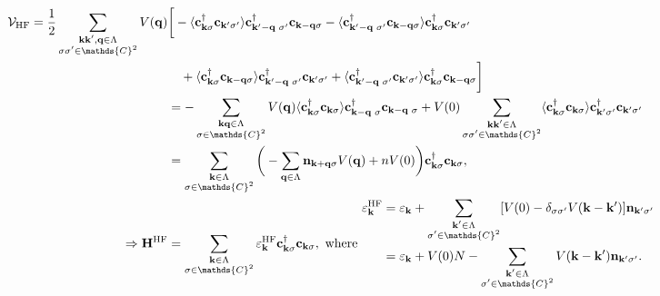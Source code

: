 \documentclass{homework}
\begin{document}
\begin{equation}
\begin{split}
    \mathcal{V}_{\textnormal{HF}} = \frac{1}{2} \sum_{\substack{{\bf k}{\bf k}',{\bf q} \in \Lambda\\
    \sigma \sigma' \in \mathds{C}^2}} V({\bf q}) &\bigg[-\langle 
    {\bf c}_{{\bf k}\sigma}^\dagger {\bf c}_{{\bf k}'\sigma'}
    \rangle {\bf c}_{{\bf k}'-{\bf q} \blanky \sigma'}^\dagger {\bf c}_{{\bf k}-{\bf q} \sigma} 
    -  \langle {\bf c}_{{\bf k}'-{\bf q} \blanky \sigma'}^\dagger {\bf c}_{{\bf k}-{\bf q} \sigma}  \rangle {\bf c}_{{\bf k}\sigma}^\dagger {\bf c}_{{\bf k}'\sigma'} \\
    & \blanky \blanky \blanky + \langle {\bf c}_{{\bf k}\sigma}^\dagger {\bf c}_{{\bf k}-{\bf q} \sigma} \rangle {\bf c}_{{\bf k}'-{\bf q} \blanky \sigma'}^\dagger {\bf c}_{{\bf k}'\sigma'}
    +  \langle {\bf c}_{{\bf k}'-{\bf q} \blanky \sigma'}^\dagger {\bf c}_{{\bf k}'\sigma'} \rangle {\bf c}_{{\bf k}\sigma}^\dagger {\bf c}_{{\bf k}-{\bf q} \sigma} 
    \bigg] \\
    &= - \sum_{\substack{{\bf k}{\bf q} \in \Lambda\\
    \sigma \in \mathds{C}^2}} V({\bf q})  \langle {\bf c}_{{\bf k} \sigma}^\dagger {\bf c}_{{\bf k} \sigma} \rangle {\bf c}_{{\bf k}-{\bf q} \blanky \sigma}^\dagger {\bf c}_{{\bf k}-{\bf q} \blanky \sigma} + V(0) \sum_{\substack{{\bf k}{\bf k}' \in \Lambda\\
    \sigma \sigma' \in \mathds{C}^2}} \langle {\bf c}_{{\bf k} \sigma}^\dagger {\bf c}_{{\bf k} \sigma} \rangle  {\bf c}_{{\bf k}' \sigma'}^\dagger {\bf c}_{{\bf k}' \sigma'} \\
    &= \sum_{\substack{{\bf k} \in \Lambda\\
    \sigma \in \mathds{C}^2}} \bigg(-\sum_{{\bf q} \in \Lambda} {\bf n}_{{\bf k}+{\bf q} \sigma} V({\bf q}) + nV(0)\bigg){\bf c}_{{\bf k} \sigma}^\dagger {\bf c}_{{\bf k} \sigma}, \\
    \Rightarrow  {\bf H}^{\textnormal{HF}} &= \sum_{\substack{{\bf k} \in \Lambda\\
    \sigma \in \mathds{C}^2}} \varepsilon_{\bf k}^{\textnormal{HF}} {\bf c}_{{\bf k} \sigma}^\dagger {\bf c}_{{\bf k} \sigma}, \textnormal{ where } \begin{split}
        \varepsilon_{\bf k}^{\textnormal{HF}} &= \varepsilon_{\bf k} + \sum_{\substack{{\bf k}' \in \Lambda\\
    \sigma' \in \mathds{C}^2}} [V(0) - \delta_{\sigma\sigma'} V({\bf k}- {\bf k}')] {\bf n}_{{\bf k}' \sigma'} \\
        &= \varepsilon_{\bf k} + V(0) N - \sum_{\substack{{\bf k}' \in \Lambda\\
    \sigma' \in \mathds{C}^2}} V({\bf k}- {\bf k}') {\bf n}_{{\bf k'} \sigma'}.
    \end{split}
    \end{split}
\end{equation}
\end{document}
